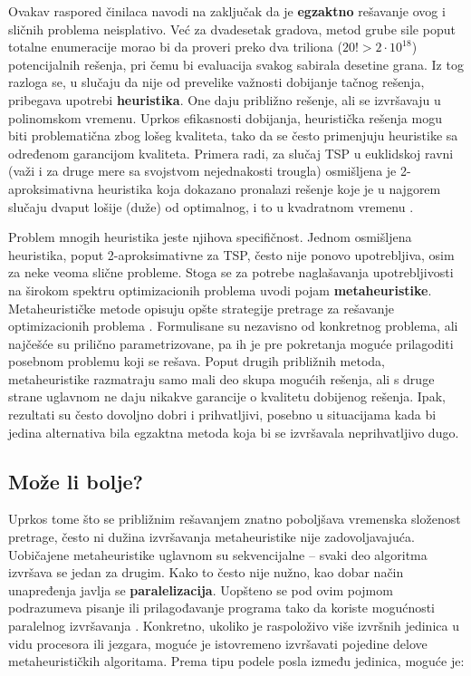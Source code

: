 \documentclass[a4paper]{article}
\begin{document}
Ovakav raspored činilaca navodi na zaključak da je \textbf{egzaktno} rešavanje ovog i sličnih problema neisplativo. Već za dvadesetak gradova, metod grube sile poput totalne enumeracije morao bi da proveri preko dva triliona ($20! > 2\cdot10^{18}$) potencijalnih rešenja, pri čemu bi evaluacija svakog sabirala desetine grana. Iz tog razloga se, u slučaju da nije od prevelike važnosti dobijanje tačnog rešenja, pribegava upotrebi \textbf{heuristika}. One daju približno rešenje, ali se izvršavaju u polinomskom vremenu. Uprkos efikasnosti dobijanja, heuristička rešenja mogu biti problematična zbog lošeg kvaliteta, tako da se često primenjuju heuristike sa određenom garancijom kvaliteta. Primera radi, za slučaj TSP u euklidskoj ravni (važi i za druge mere sa svojstvom nejednakosti trougla) osmišljena je 2-aproksimativna heuristika \cite{ri} koja dokazano pronalazi rešenje koje je u najgorem slučaju dvaput lošije (duže) od optimalnog, i to u kvadratnom vremenu \cite{aa}.

Problem mnogih heuristika jeste njihova specifičnost. Jednom osmišljena heuristika, poput 2-aproksimativne za TSP, često nije ponovo upotrebljiva, osim za neke veoma slične probleme. Stoga se za potrebe naglašavanja upotrebljivosti na širokom spektru optimizacionih problema uvodi pojam \textbf{metaheuristike}. Metaheurističke metode opisuju opšte strategije pretrage za rešavanje optimizacionih problema \cite{vi}. Formulisane su nezavisno od konkretnog problema, ali najčešće su prilično parametrizovane, pa ih je pre pokretanja moguće prilagoditi posebnom problemu koji se rešava. Poput drugih približnih metoda, metaheuristike razmatraju samo mali deo skupa mogućih rešenja, ali s druge strane uglavnom ne daju nikakve garancije o kvalitetu dobijenog rešenja. Ipak, rezultati su često dovoljno dobri i prihvatljivi, posebno u situacijama kada bi jedina alternativa bila egzaktna metoda koja bi se izvršavala neprihvatljivo dugo.

\subsection{Može li bolje?}

Uprkos tome što se približnim rešavanjem znatno poboljšava vremenska složenost pretrage, često ni dužina izvršavanja metaheuristike nije zadovoljavajuća. Uobičajene metaheuristike uglavnom su sekvencijalne -- svaki deo algoritma izvršava se jedan za drugim. Kako to često nije nužno, kao dobar način unapređenja javlja se \textbf{paralelizacija}. Uopšteno se pod ovim pojmom podrazumeva pisanje ili prilagođavanje programa tako da koriste mogućnosti paralelnog izvršavanja \cite{rs}. Konkretno, ukoliko je raspoloživo više izvršnih jedinica u vidu procesora ili jezgara, moguće je istovremeno izvršavati pojedine delove metaheurističkih algoritama. Prema tipu podele posla između jedinica, moguće je:
\end{document}
